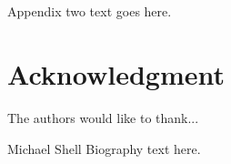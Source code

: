\documentclass[journal]{IEEEtran}
\begin{document}
\section{}
Appendix two text goes here.


\section*{Acknowledgment}


The authors would like to thank...


\ifCLASSOPTIONcaptionsoff
  \newpage
\fi









\begin{IEEEbiography}{Michael Shell}
Biography text here.
\end{IEEEbiography}




\end{document}
